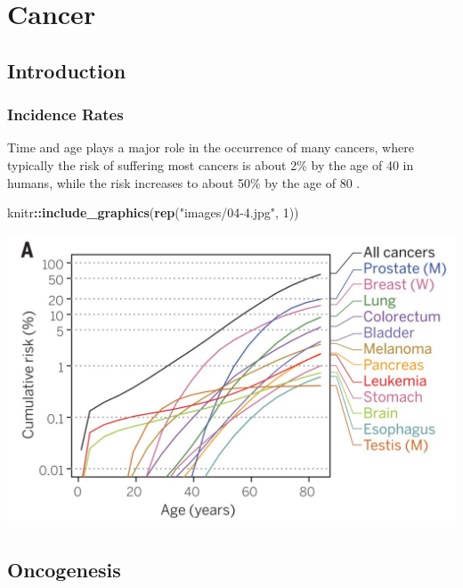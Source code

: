 \documentclass[]{book}
\newenvironment{Shaded}{\begin{snugshade}}{\end{snugshade}}
\newcommand{\KeywordTok}[1]{\textcolor[rgb]{0.13,0.29,0.53}{\textbf{#1}}}
\newcommand{\DecValTok}[1]{\textcolor[rgb]{0.00,0.00,0.81}{#1}}
\newcommand{\StringTok}[1]{\textcolor[rgb]{0.31,0.60,0.02}{#1}}
\newcommand{\OperatorTok}[1]{\textcolor[rgb]{0.81,0.36,0.00}{\textbf{#1}}}
\newcommand{\NormalTok}[1]{#1}
\begin{document}
\chapter{Cancer}\label{cancer}

\section{Introduction}\label{introduction-4}

\subsection{Incidence Rates}\label{incidence-rates}

Time and age plays a major role in the occurrence of many cancers, where
typically the risk of suffering most cancers is about 2\% by the age of
40 in humans, while the risk increases to about 50\% by the age of 80
\citep{martincorena2015somatic}.

\begin{Shaded}
\begin{Highlighting}[]
\NormalTok{knitr}\OperatorTok{::}\KeywordTok{include_graphics}\NormalTok{(}\KeywordTok{rep}\NormalTok{(}\StringTok{"images/04-4.jpg"}\NormalTok{, }\DecValTok{1}\NormalTok{))}
\end{Highlighting}
\end{Shaded}

\includegraphics{images/04-4.jpg}

\section{Oncogenesis}\label{oncogenesis}
\end{document}
